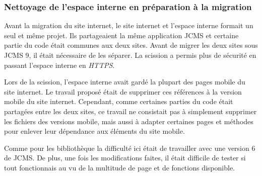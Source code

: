 \documentclass[12pt,a4paper]{article}
\begin{document}
\subsubsection{Nettoyage de l'espace interne en préparation à la migration}
Avant la migration du site internet, le site internet et l'espace interne formait un seul et même projet. Ils partageaient la même application \gls{JCMS} et certaine partie du code était communes aux deux sites. Avant de migrer les deux sites sous \gls{JCMS} 9, il était nécessaire de les séparer. La scission a permis plus de sécurité en passant l'espace interne en \textit{HTTPS}.\par 
Lors de la scission, l'espace interne avait gardé la plupart des pages mobile du site internet. Le travail proposé était de supprimer ces références à la version mobile du site internet. Cependant, comme certaines parties du code était partagées entre les deux sites, ce travail ne consistait pas à simplement supprimer les fichiers des versions mobile, mais aussi à adapter certaines pages et méthodes pour enlever leur dépendance aux éléments du site mobile.\par 
Comme pour les bibliothèque la difficulté ici était de travailler avec une version 6 de \gls{JCMS}. De plus, une fois les modifications faites, il était difficile de tester si tout fonctionnais au vu de la multitude de page et de fonctions disponible.\par

\newpage
\end{document}
